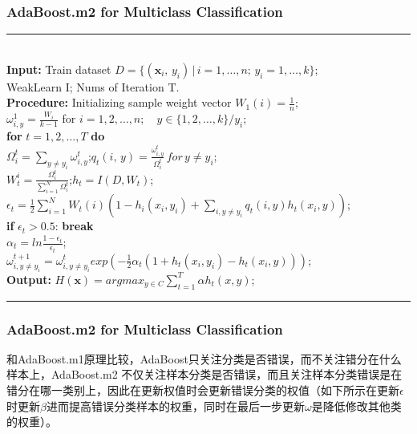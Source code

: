 \documentclass[usenames,dvipsnames]{beamer}
\begin{document}
\begin{frame}
\frametitle{AdaBoost.m2 for Multiclass Classification}
\noindent\rule[0.1\baselineskip]{\textwidth}{0.75pt}\\
\textbf{Input:} Train dataset $D = \{(\textbf{x}_i,\,y_i)\,|\,i = 1, \dots, n;\, y_i = 1,\dots, k\}$;\\
\hspace*{32pt} WeakLearn I; Nums of Iteration T.\\
\textbf{Procedure:} 
    \hspace*{2pt} Initializing sample weight vector $W_1(i) = \frac{1}{n}$;\\
    \hspace*{36pt}$\omega_{i,y}^1 = \frac{W_i}{k-1}$ for $i = 1, 2, \dots, n;\quad y\in \{1,2,\dots,k\}\slash{y_i}$; \\
    \hspace*{32pt} \textbf{for} $t = 1, 2,\dots, T$ \textbf{do}\\
        \hspace*{48pt} $\Omega_i^t = \sum_{y\neq y_i}\omega_{i,y}^t$;\quad $q_t(i,\,y) = \frac{\omega_{i,y}^t}{\Omega_i^t}\,for\,y\neq y_i$;\\
        \hspace*{48pt} $W_t^i = \frac{\Omega_i^t}{\sum_{i=1}^{N}\Omega_i^t}$;\quad $h_t = I(D, W_t)$;\\
        \hspace*{48pt} $\epsilon_t = \frac{1}{2}\sum_{i=1}^{N}W_t(i)(1-h_i(x_i, y_i)+\sum_{i,y\neq y_i}q_t(i,y)h_t(x_i,y))$;\\
        \hspace*{48pt} \textbf{if} $\epsilon_t > 0.5$: \textbf{break}\\
        \hspace*{48pt} $\alpha_t = ln\frac{1-\epsilon_t}{\epsilon_t}$;\\
        \hspace*{48pt} $\omega_{i,y\neq y_i}^{t+1} = \omega_{i,y\neq y_i}^texp(-\frac{1}{2}\alpha_t(1+h_t(x_i,y_i)-h_t(x_i,y)))$;\\
\textbf{Output:} $H(\textbf{x}) = argmax_{y\in C}\sum_{t=1}^{T}\alpha h_t(x,y)$;\\
\noindent\rule[0.1\baselineskip]{\textwidth}{0.75pt}\par
\end{frame}
\begin{frame}
\frametitle{AdaBoost.m2 for Multiclass Classification}
和AdaBoost.m1原理比较，AdaBoost只关注分类是否错误，而不关注错分在什么样本上，AdaBoost.m2 不仅关注样本分类是否错误，而且关注样本分类错误是在错分在哪一类别上，因此在更新权值时会更新错误分类的权值（如下所示在更新$\epsilon$时更新$\beta$进而提高错误分类样本的权重，同时在最后一步更新$\omega$是降低修改其他类的权重）。
\end{frame}
\end{document}
